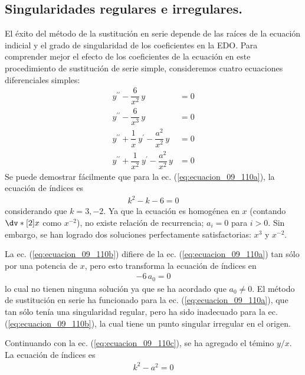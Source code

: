 \subsection*{Singularidades regulares e irregulares.}
El éxito del método de la sustitución en serie depende de las raíces de la ecuación indicial y el grado de singularidad de los coeficientes en la EDO. Para comprender mejor el efecto de los coeficientes de la ecuación en este procedimiento de sustitución de serie simple, consideremos cuatro ecuaciones diferenciales simples:
\begin{subequations}
\begin{align}
y^{\prime \prime} - \dfrac{6}{x^{2}} \, y &= 0 \label{eq:ecuacion_09_110a} \\[0.25em]
y^{\prime \prime} - \dfrac{6}{x^{3}} \, y &= 0 \label{eq:ecuacion_09_110b} \\[0.25em]
y^{\prime \prime} + \dfrac{1}{x} \: y^{\prime} - \dfrac{a^{2}}{x^{2}} \, y &= 0 \label{eq:ecuacion_09_110c} \\[0.25em]
y^{\prime \prime} + \dfrac{1}{x^{2}} \: y^{\prime} - \dfrac{a^{2}}{x^{2}} \, y &= 0 \label{eq:ecuacion_09_110d}
\end{align}
\end{subequations}
Se puede demostrar fácilmente que para la ec. (\ref{eq:ecuacion_09_110a}), la ecuación de índices es
\begin{align*}
k^{2} - k - 6 = 0
\end{align*}
considerando que $k = 3, -2$. Ya que la ecuación es homogénea en $x$ (contando $\dv*[2]{x}$ como $x^{-2}$), no existe relación de recurrencia; $a_{i} = 0$ para $i > 0$. Sin embargo, se han logrado dos soluciones perfectamente satisfactorias: $x^{3}$ y $x^{-2}$.
\par
La ec. (\ref{eq:ecuacion_09_110b}) difiere de la ec. (\ref{eq:ecuacion_09_110a}) tan sólo por una potencia de $x$, pero esto transforma la ecuación de índices en
\begin{align*}
- 6 \, a_{0} = 0
\end{align*}
lo cual no tienen ninguna solución ya que se ha acordado que $a_{0} \neq 0$. El método de sustitución en serie ha funcionado para la ec. (\ref{eq:ecuacion_09_110a}), que tan sólo tenía una singularidad regular, pero ha sido inadecuado para la ec. (\ref{eq:ecuacion_09_110b}), la cual tiene un punto singular irregular en el origen.
\par
Continuando con la ec. (\ref{eq:ecuacion_09_110c}), se ha agregado el témino $y/x$. La ecuación de índices es
\begin{align*}
k^{2} - a^{2} = 0
\end{align*}
